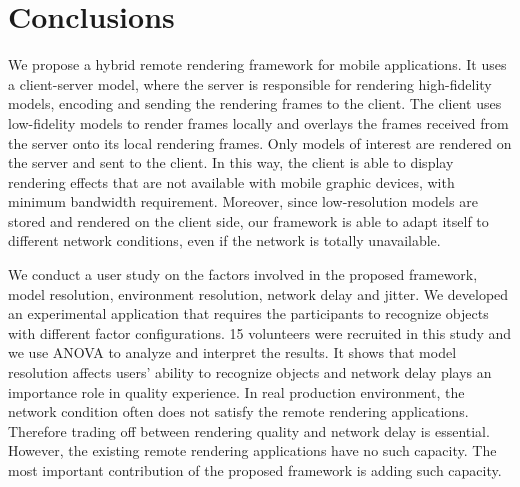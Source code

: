 \section{Conclusions}

We propose a hybrid remote rendering framework for mobile applications.
It uses a client-server model, where the server is responsible for rendering high-fidelity models, encoding and sending the rendering frames to the client.
The client uses low-fidelity models to render frames locally and overlays the frames received from the server onto its local rendering frames.
Only models of interest are rendered on the server and sent to the client.
In this way, the client is able to display rendering effects that are not available with mobile graphic devices, with minimum bandwidth requirement.
Moreover, since low-resolution models are stored and rendered on the client side, our framework is able to adapt itself to different network conditions, even if the network is totally unavailable.

We conduct a user study on the factors involved in the proposed framework, model resolution, environment resolution, network delay and jitter. We developed an experimental application that requires the participants to recognize objects with different factor configurations. 15 volunteers were recruited in this study and we use ANOVA to analyze and interpret the results. It shows that model resolution affects users' ability to recognize objects and network delay plays an importance role in quality experience. In real production environment, the network condition often does not satisfy the remote rendering applications. Therefore trading off between rendering quality and network delay is essential. However, the existing remote rendering applications have no such capacity. The most important contribution of the proposed framework is adding such capacity.
